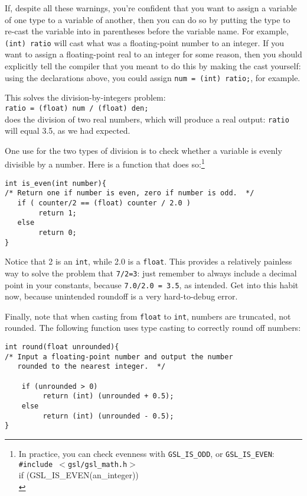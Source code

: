 \documentclass[12pt]{article}
\begin{document}
If, despite all these warnings, you're confident that you want to assign a variable of one type
to a variable of another, then you can do so by putting the type to
re-cast the variable into in parentheses before the variable name. For
example, {\tt (int) ratio} will cast what was a floating-point number to an integer. 
If you want to assign a floating-point real to an integer for some reason, then you should explicitly tell
the compiler that you meant to do this by making the cast yourself: using the declarations above, 
you could assign {\tt num = (int) ratio;}, for example. 

This solves the division-by-integers problem: \\
{\tt ratio = (float) num / (float) den;}\\
does the division of two real numbers, which will produce a real output: {\tt ratio} will equal 3.5, as we
had expected.


One use for the two types of division is to check whether a variable is evenly divisible by a number. Here
is a function that does so:\footnote{In practice, you can check evenness
with {\tt GSL\_IS\_ODD}, or {\tt GSL\_IS\_EVEN}:\\ 
{\tt \#include $<$gsl/gsl\_math.h$>$}\\
if (GSL\_IS\_EVEN(an\_integer))\\
\phantom{hello.}{\tt do\_something();}
}

\begin{verbatim}
int is_even(int number){
/* Return one if number is even, zero if number is odd.  */
   if ( counter/2 == (float) counter / 2.0 )
        return 1;
   else 
        return 0;
}
\end{verbatim}
Notice that 2 is an {\tt int}, while 2.0 is a {\tt float}. This provides
a relatively painless way to solve the problem that {\tt 7/2=3}: just
remember to always include a decimal point in your constants, because
{\tt 7.0/2.0 = 3.5}, as intended. Get into this habit now,
because unintended roundoff is a very hard-to-debug error.

Finally, note that when casting from {\tt float} to {\tt int}, numbers
are truncated, not rounded.  The following function uses type casting
to correctly round off numbers:

\begin{verbatim}
int round(float unrounded){
/* Input a floating-point number and output the number
   rounded to the nearest integer.  */

    if (unrounded > 0)
         return (int) (unrounded + 0.5);
    else
         return (int) (unrounded - 0.5);
}
\end{verbatim}
\end{document}
